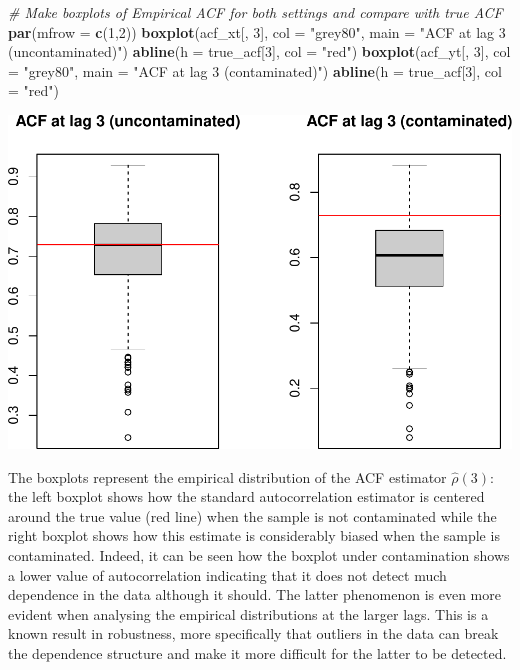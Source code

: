 \documentclass[]{book}
\newenvironment{Shaded}{\begin{snugshade}}{\end{snugshade}}
\newcommand{\KeywordTok}[1]{\textcolor[rgb]{0.13,0.29,0.53}{\textbf{#1}}}
\newcommand{\DataTypeTok}[1]{\textcolor[rgb]{0.13,0.29,0.53}{#1}}
\newcommand{\DecValTok}[1]{\textcolor[rgb]{0.00,0.00,0.81}{#1}}
\newcommand{\StringTok}[1]{\textcolor[rgb]{0.31,0.60,0.02}{#1}}
\newcommand{\CommentTok}[1]{\textcolor[rgb]{0.56,0.35,0.01}{\textit{#1}}}
\newcommand{\NormalTok}[1]{#1}
\theoremstyle{definition}
\theoremstyle{definition}
\theoremstyle{definition}
\theoremstyle{remark}
\begin{document}
\begin{Shaded}
\begin{Highlighting}[]
\CommentTok{# Make boxplots of Empirical ACF for both settings and compare with true ACF}
\KeywordTok{par}\NormalTok{(}\DataTypeTok{mfrow =} \KeywordTok{c}\NormalTok{(}\DecValTok{1}\NormalTok{,}\DecValTok{2}\NormalTok{))}
\KeywordTok{boxplot}\NormalTok{(acf_xt[, }\DecValTok{3}\NormalTok{], }\DataTypeTok{col =} \StringTok{"grey80"}\NormalTok{, }\DataTypeTok{main =} \StringTok{"ACF at lag 3 (uncontaminated)"}\NormalTok{)}
\KeywordTok{abline}\NormalTok{(}\DataTypeTok{h =}\NormalTok{ true_acf[}\DecValTok{3}\NormalTok{], }\DataTypeTok{col =} \StringTok{"red"}\NormalTok{)}
\KeywordTok{boxplot}\NormalTok{(acf_yt[, }\DecValTok{3}\NormalTok{], }\DataTypeTok{col =} \StringTok{"grey80"}\NormalTok{, }\DataTypeTok{main =} \StringTok{"ACF at lag 3 (contaminated)"}\NormalTok{)}
\KeywordTok{abline}\NormalTok{(}\DataTypeTok{h =}\NormalTok{ true_acf[}\DecValTok{3}\NormalTok{], }\DataTypeTok{col =} \StringTok{"red"}\NormalTok{)}
\end{Highlighting}
\end{Shaded}

\includegraphics{ts_files/figure-latex/simulationRobust-1.pdf}

The boxplots represent the empirical distribution of the ACF estimator
\(\hat{\rho}(3)\): the left boxplot shows how the standard
autocorrelation estimator is centered around the true value (red line)
when the sample is not contaminated while the right boxplot shows how
this estimate is considerably biased when the sample is contaminated.
Indeed, it can be seen how the boxplot under contamination shows a lower
value of autocorrelation indicating that it does not detect much
dependence in the data although it should. The latter phenomenon is even
more evident when analysing the empirical distributions at the larger
lags. This is a known result in robustness, more specifically that
outliers in the data can break the dependence structure and make it more
difficult for the latter to be detected.
\end{document}
